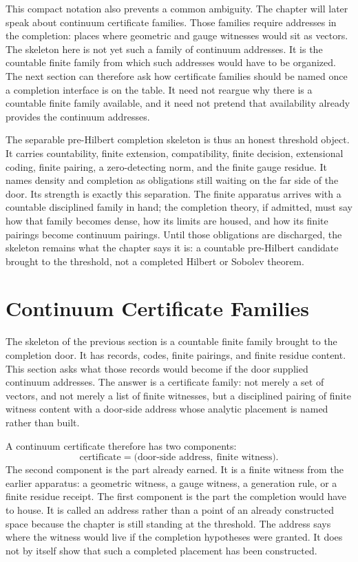This compact notation also prevents a common ambiguity. The chapter will later
speak about continuum certificate families. Those families require addresses
in the completion: places where geometric and gauge witnesses would sit as
vectors. The skeleton here is not yet such a family of continuum addresses. It
is the countable finite family from which such addresses would have to be
organized. The next section can therefore ask how certificate families should
be named once a completion interface is on the table. It need not reargue why
there is a countable finite family available, and it need not pretend that
availability already provides the continuum addresses.

The separable pre-Hilbert completion skeleton is thus an honest threshold
object. It carries countability, finite extension, compatibility, finite
decision, extensional coding, finite pairing, a zero-detecting norm, and the
finite gauge residue. It names density and completion as obligations still
waiting on the far side of the door. Its strength is exactly this separation.
The finite apparatus arrives with a countable disciplined family in hand; the
completion theory, if admitted, must say how that family becomes dense, how its
limits are housed, and how its finite pairings become continuum pairings. Until
those obligations are discharged, the skeleton remains what the chapter says it
is: a countable pre-Hilbert candidate brought to the threshold, not a completed
Hilbert or Sobolev theorem.

\section{Continuum Certificate Families}

The skeleton of the previous section is a countable finite family brought to
the completion door. It has records, codes, finite pairings, and finite residue
content. This section asks what those records would become if the door supplied
continuum addresses. The answer is a certificate family: not merely a set of
vectors, and not merely a list of finite witnesses, but a disciplined pairing
of finite witness content with a door-side address whose analytic placement is
named rather than built.

A continuum certificate therefore has two components:
\[
  \text{certificate}
    =
    \big(\text{door-side address},\ \text{finite witness}\big).
\]
The second component is the part already earned. It is a finite witness from
the earlier apparatus: a geometric witness, a gauge witness, a generation rule,
or a finite residue receipt. The first component is the part the completion
would have to house. It is called an address rather than a point of an already
constructed space because the chapter is still standing at the threshold. The
address says where the witness would live if the completion hypotheses were
granted. It does not by itself show that such a completed placement has been
constructed.

